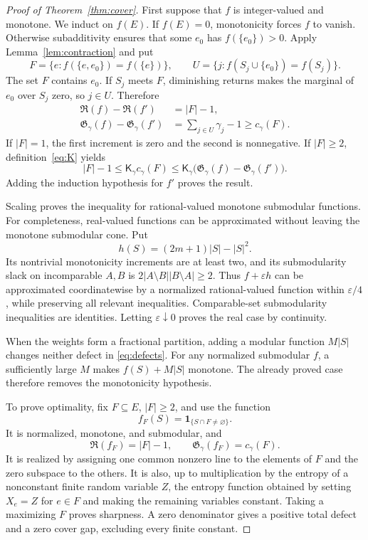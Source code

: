 \documentclass[11pt]{article}
\theoremstyle{definition}
\theoremstyle{remark}
\newcommand{\1}{\mathbf 1}
\newcommand{\Red}{\mathfrak R}
\newcommand{\Gap}{\mathfrak G}
\newcommand{\Kopt}{\mathsf K}
\begin{document}
\begin{proof}[Proof of Theorem~\ref{thm:cover}]
First suppose that $f$ is integer-valued and monotone. We induct on $f(E)$.
If $f(E)=0$, monotonicity forces $f$ to vanish. Otherwise subadditivity ensures
that some $e_0$ has $f(\{e_0\})>0$. Apply Lemma~\ref{lem:contraction} and put
\[
 F=\{e:f(\{e,e_0\})=f(\{e\})\},\qquad
 U=\{j:f(S_j\cup\{e_0\})=f(S_j)\}.
\]
The set $F$ contains $e_0$. If $S_j$ meets $F$, diminishing returns makes the
marginal of $e_0$ over $S_j$ zero, so $j\in U$. Therefore
\begin{align}
 \Red(f)-\Red(f')&=|F|-1,\label{eq:Rincrement}\\
 \Gap_\gamma(f)-\Gap_\gamma(f')&=\sum_{j\in U}\gamma_j-1
 \ge c_\gamma(F).\label{eq:Gincrement}
\end{align}
If $|F|=1$, the first increment is zero and the second is nonnegative.
If $|F|\ge2$, definition~\eqref{eq:K} yields
\[
 |F|-1\le \Kopt_\gamma c_\gamma(F)
 \le \Kopt_\gamma\bigl(\Gap_\gamma(f)-\Gap_\gamma(f')\bigr).
\]
Adding the induction hypothesis for $f'$ proves the result.

Scaling proves the inequality for rational-valued monotone submodular
functions. For completeness, real-valued functions can be approximated without
leaving the monotone submodular cone. Put
\[
 h(S)=(2m+1)|S|-|S|^2.
\]
Its nontrivial monotonicity increments are at least two, and its submodularity
slack on incomparable $A,B$ is $2|A\setminus B||B\setminus A|\ge2$.
Thus $f+\varepsilon h$ can be approximated coordinatewise by a normalized
rational-valued function within $\varepsilon/4$, while preserving all relevant
inequalities. Comparable-set submodularity inequalities are identities.
Letting $\varepsilon\downarrow0$ proves the real case by continuity.

When the weights form a fractional partition, adding a modular function
$M|S|$ changes neither defect in \eqref{eq:defects}. For any normalized
submodular $f$, a sufficiently large $M$ makes $f(S)+M|S|$ monotone. The already
proved case therefore removes the monotonicity hypothesis.

To prove optimality, fix $F\subseteq E$, $|F|\ge2$, and use the function
\begin{equation}
 f_F(S)=\1_{\{S\cap F\ne\varnothing\}}.
 \label{eq:rankone}
\end{equation}
It is normalized, monotone, and submodular, and
\[
 \Red(f_F)=|F|-1,\qquad \Gap_\gamma(f_F)=c_\gamma(F).
\]
It is realized by assigning one common nonzero line to the elements of $F$
and the zero subspace to the others. It is also, up to multiplication by the
entropy of a nonconstant finite random variable $Z$, the entropy function
obtained by setting $X_e=Z$ for $e\in F$ and making the remaining variables
constant. Taking a maximizing $F$ proves sharpness. A zero denominator gives a
positive total defect and a zero cover gap, excluding every finite constant.
\end{proof}
\end{document}
